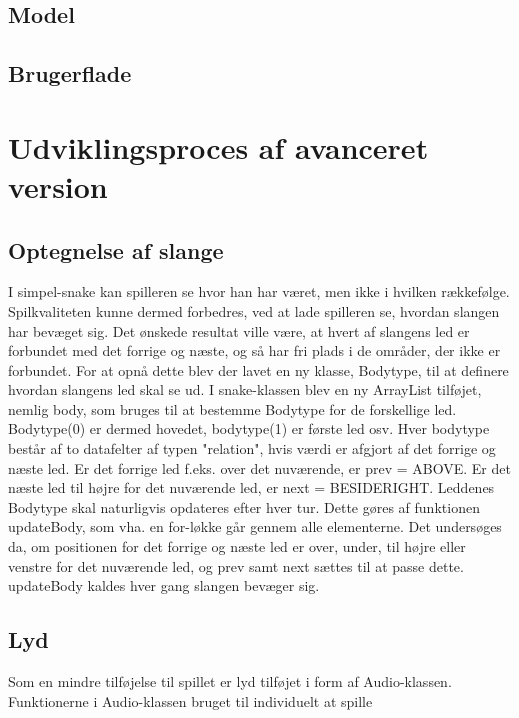 \documentclass{report}
\begin{document}
\subsection{Model}

\subsection{Brugerflade}


\section{Udviklingsproces  af avanceret version}

\subsection{Optegnelse af slange}

I simpel-snake kan spilleren se hvor han har været, men ikke i hvilken rækkefølge. Spilkvaliteten kunne dermed forbedres, ved at lade spilleren se, hvordan slangen har bevæget sig. Det ønskede resultat ville være, at hvert af slangens led er forbundet med det forrige og næste, og så har fri plads i de områder, der ikke er forbundet.
For at opnå dette blev der lavet en ny klasse, Bodytype, til at definere hvordan slangens led skal se ud. I snake-klassen blev en ny ArrayList tilføjet, nemlig body, som bruges til at bestemme Bodytype for de forskellige led. Bodytype(0) er dermed hovedet, bodytype(1) er første led osv. Hver bodytype består af to datafelter af typen "relation", hvis værdi er afgjort af det forrige og næste led. Er det forrige led f.eks. over det nuværende, er prev = ABOVE. Er det næste led til højre for det nuværende led, er next = BESIDERIGHT.
Leddenes Bodytype skal naturligvis opdateres efter hver tur. Dette gøres af funktionen updateBody, som vha. en for-løkke går gennem alle elementerne. Det undersøges da, om positionen for det forrige og næste led er over, under, til højre eller venstre for det nuværende led, og prev samt next sættes til at passe dette. updateBody kaldes hver gang slangen bevæger sig.

\subsection{Lyd}

Som en mindre tilføjelse til spillet er lyd tilføjet i form af Audio-klassen. Funktionerne i Audio-klassen bruget til individuelt at spille 	
\end{document}
